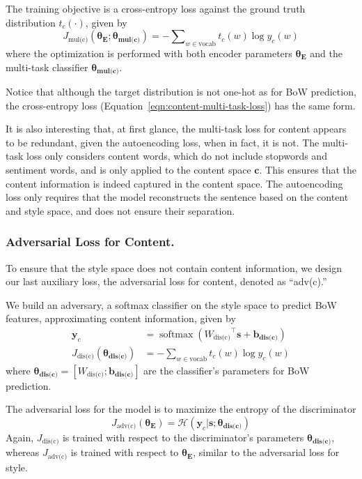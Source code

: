 \documentclass[letterpaper]{article} %
\newcommand{\loss}[1]{J_{\text{#1}}}
\newcommand{\nnweight}[1]{\bm{\theta_{\text{#1}}}}
\newcommand{\weight}[1]{W_{\text{#1}}}
\newcommand{\bias}[1]{\bm{b_{\text{#1}}}}
\begin{document}
The training objective is a cross-entropy loss against the ground truth distribution $t_c(\cdot)$, given by
\begin{equation}\label{eqn:content-multi-task-loss}
	\loss{mul(c)}(\nnweight{E};\nnweight{mul(c)}) = - \sum\nolimits_{w\in\text{vocab}} t_c(w)\log y_c(w)
\end{equation}
where the optimization is performed with both encoder parameters $\nnweight{E}$ and the multi-task classifier $\nnweight{mul(c)}$.

Notice that although the target distribution is not one-hot as for BoW prediction, the cross-entropy loss (Equation~\ref{eqn:content-multi-task-loss}) has the same form.

It is also interesting that, at first glance, the multi-task loss for content appears to be redundant, given the autoencoding loss, when in fact, it is not. The multi-task loss only considers content words, which do not include stopwords and sentiment words, and is only applied to the content space $\bm c$. This ensures that the content information is indeed captured in the content space. The autoencoding loss only requires that the model reconstructs the sentence based on the content and style space, and does not ensure their separation.

\subsubsection{Adversarial Loss for Content.} \label{ssec:adversarial-content-objective}

To ensure that the style space does not contain content information, we design our last auxiliary loss, the adversarial loss for content, denoted as ``adv(c).''

We build an adversary, a softmax classifier on the style space to predict BoW features, approximating content information, given by
\begin{align}
	\label{eqn:adv-bow-disc-loss}
	\bm y_c                          & = \operatorname{softmax}({\weight{dis(c)}}^\top \bm s + \bias{dis(c)}) \\
	\loss{dis(c)}(\nnweight{dis(c)}) & = - \sum\nolimits_{w\in\text{vocab}} t_c(w)\log y_c(w)
\end{align}
where $\nnweight{dis(c)}=[\weight{dis(c)}; \bias{dis(c)}]$ are the classifier's parameters for BoW prediction.

The adversarial loss for the model is to maximize the entropy of the discriminator
\begin{equation}
	\loss{adv(c)}(\nnweight{E}) = \mathcal{H}(\bm y_c | \bm s; \nnweight{dis(c)})
\end{equation}
Again, $\loss{dis(c)}$ is trained with respect to the discriminator's parameters $\nnweight{dis(c)}$, whereas $\loss{adv(c)}$ is trained with respect to $\nnweight{E}$, similar to the adversarial loss for style.
\end{document}
